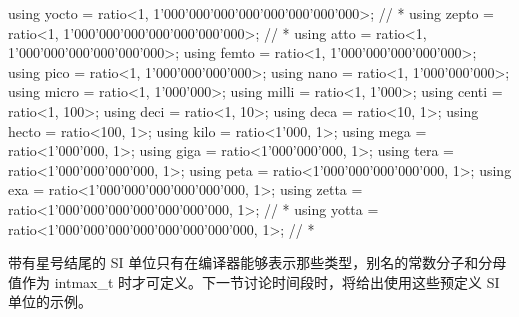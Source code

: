 \begin{cpp}
using yocto = ratio<1, 1'000'000'000'000'000'000'000'000>; // *
using zepto = ratio<1, 1'000'000'000'000'000'000'000>; // *
using atto = ratio<1, 1'000'000'000'000'000'000>;
using femto = ratio<1, 1'000'000'000'000'000>;
using pico = ratio<1, 1'000'000'000'000>;
using nano = ratio<1, 1'000'000'000>;
using micro = ratio<1, 1'000'000>;
using milli = ratio<1, 1'000>;
using centi = ratio<1, 100>;
using deci = ratio<1, 10>;
using deca = ratio<10, 1>;
using hecto = ratio<100, 1>;
using kilo = ratio<1'000, 1>;
using mega = ratio<1'000'000, 1>;
using giga = ratio<1'000'000'000, 1>;
using tera = ratio<1'000'000'000'000, 1>;
using peta = ratio<1'000'000'000'000'000, 1>;
using exa = ratio<1'000'000'000'000'000'000, 1>;
using zetta = ratio<1'000'000'000'000'000'000'000, 1>; // *
using yotta = ratio<1'000'000'000'000'000'000'000'000, 1>; // *
\end{cpp}

带有星号结尾的 SI 单位只有在编译器能够表示那些类型，别名的常数分子和分母值作为 intmax\_t 时才可定义。下一节讨论时间段时，将给出使用这些预定义 SI 单位的示例。




